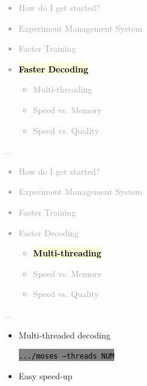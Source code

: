 \documentclass[landscape]{uedslides2C}
\newcommand{\currenttopic}[1]{\colorbox{lightyellow}{\textcolor{black}{\bf #1}}}
\newcommand{\littlecode}[1]{\colorbox{gray}{\textcolor{black}{\small \tt #1}}}
\begin{document}
\vspace{-5mm}
\textcolor{darkgrey}{
\begin{itemize} \itemsep -1mm
\item {How do I get started?}
\item {Experiment Management System}
\item {Faster Training}
\item \currenttopic{Faster Decoding}
  \begin{itemize}
  \item Multi-threading
  \item Speed vs. Memory
  \item Speed vs. Quality
  \end{itemize}
\end{itemize}
...
}


\vspace{-5mm}
\textcolor{darkgrey}{
\begin{itemize} \itemsep -1mm
\item {How do I get started?}
\item {Experiment Management System}
\item {Faster Training}
\item {Faster Decoding}
  \begin{itemize}
  \item \currenttopic{Multi-threading}
  \item Speed vs. Memory
  \item Speed vs. Quality
  \end{itemize}
\end{itemize}
...
}



\vspace{15mm}
\begin{itemize}
\item Multi-threaded decoding 
\begin{center}
\littlecode{.../moses --threads NUM}
\end{center}
\item Easy speed-up

\end{itemize}


\end{document}
